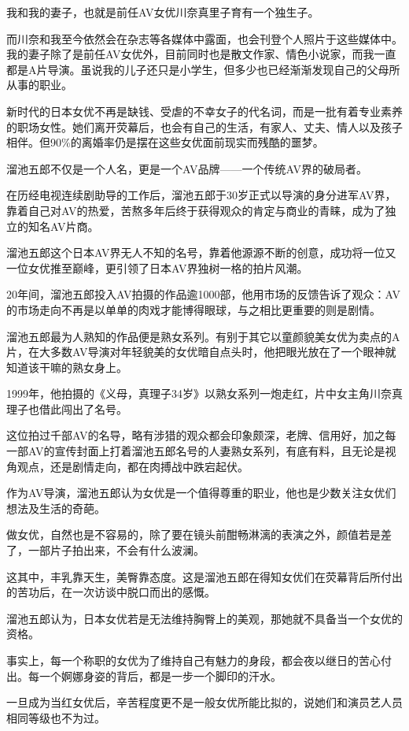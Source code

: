 \documentclass[12pt,UTF8]{ctexbook}
\begin{document}
我和我的妻子，也就是前任AV女优川奈真里子育有一个独生子。

而川奈和我至今依然会在杂志等各媒体中露面，也会刊登个人照片于这些媒体中。我的妻子除了是前任AV女优外，目前同时也是散文作家、情色小说家，而我一直都是A片导演。虽说我的儿子还只是小学生，但多少也已经渐渐发现自己的父母所从事的职业。

新时代的日本女优不再是缺钱、受虐的不幸女子的代名词，而是一批有着专业素养的职场女性。她们离开荧幕后，也会有自己的生活，有家人、丈夫、情人以及孩子相伴。但90\%的离婚率仍是摆在这些女优面前现实而残酷的噩梦。

溜池五郎不仅是一个人名，更是一个AV品牌——一个传统AV界的破局者。

在历经电视连续剧助导的工作后，溜池五郎于30岁正式以导演的身分进军AV界，靠着自己对AV的热爱，苦熬多年后终于获得观众的肯定与商业的青睐，成为了独立的知名AV片商。

溜池五郎这个日本AV界无人不知的名号，靠着他源源不断的创意，成功将一位又一位女优推至巅峰，更引领了日本AV界独树一格的拍片风潮。

20年间，溜池五郎投入AV拍摄的作品逾1000部，他用市场的反馈告诉了观众：AV的市场走向不再是以单单的肉戏才能博得眼球，与之相比更重要的则是剧情。

溜池五郎最为人熟知的作品便是熟女系列。有别于其它以童颜貌美女优为卖点的A片，在大多数AV导演对年轻貌美的女优暗自点头时，他把眼光放在了一个眼神就知道该干嘛的熟女身上。

1999年，他拍摄的《义母，真理子34岁》以熟女系列一炮走红，片中女主角川奈真理子也借此闯出了名号。

这位拍过千部AV的名导，略有涉猎的观众都会印象颇深，老牌、信用好，加之每一部AV的宣传封面上打着溜池五郎名号的人妻熟女系列，有底有料，且无论是视角观点，还是剧情走向，都在肉搏战中跌宕起伏。

作为AV导演，溜池五郎认为女优是一个值得尊重的职业，他也是少数关注女优们想法及生活的奇葩。

做女优，自然也是不容易的，除了要在镜头前酣畅淋漓的表演之外，颜值若是差了，一部片子拍出来，不会有什么波澜。

这其中，丰乳靠天生，美臀靠态度。这是溜池五郎在得知女优们在荧幕背后所付出的苦功后，在一次访谈中脱口而出的感慨。

溜池五郎认为，日本女优若是无法维持胸臀上的美观，那她就不具备当一个女优的资格。

事实上，每一个称职的女优为了维持自己有魅力的身段，都会夜以继日的苦心付出。每一个婀娜身姿的背后，都是一步一个脚印的汗水。

一旦成为当红女优后，辛苦程度更不是一般女优所能比拟的，说她们和演员艺人员相同等级也不为过。
\end{document}
